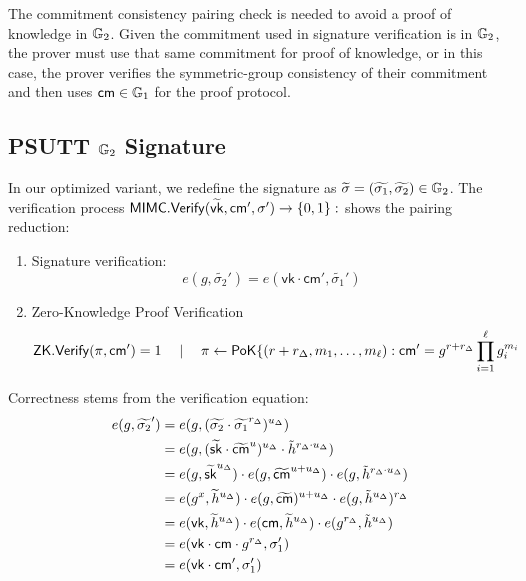 The commitment consistency pairing check is needed to avoid a proof of knowledge in $\mathbb{G}_2$. Given the commitment used in signature verification is in $\mathbb{G}_2$, the prover must use that same commitment for proof of knowledge, or in this case, the prover verifies the symmetric-group consistency of their commitment and then uses $\mathsf{cm} \in \mathbb{G}_1$ for the proof protocol. 

\subsection{PSUTT \cite{tomescu2022utt} $\mathbb{G}_2$ Signature}\label{rerandsig_g2}

In our optimized variant, we redefine the signature as $\widetilde{\sigma} = (\widetilde{\sigma_1}, \widetilde{\sigma_2}) \in \mathbb{G}_2$. The verification process $\mathsf{MIMC.Verify}(\widetilde{\mathsf{vk}}, \mathsf{cm}', {\sigma}') \to \{0,1\}:$ shows the pairing reduction:

\begin{enumerate}
    \item Signature verification:
    \[
    e(g, \widetilde{\sigma_2}') = e(\mathsf{vk} \cdot \mathsf{cm}',\widetilde{\sigma_1}')
    \]
    \item Zero-Knowledge Proof Verification
    \[
    \mathsf{ZK.Verify}(\pi, \mathsf{cm}') = 1 \quad \mid \quad \pi \gets \mathsf{PoK}\{(r + r_\Delta, m_1,\ldots,m_\ell): \mathsf{cm}' = g^{r + r_\Delta} \prod_{i=1}^\ell g_i^{m_i}
    \]
\end{enumerate}

Correctness stems from the verification equation:
    \begin{align*}
        e(g, \widetilde{\sigma_2}') &= e(g, (\widetilde{\sigma_2} \cdot \widetilde{\sigma_1}^{r_\Delta})^{u_\Delta}) \\
        &= e(g, (\widetilde{\mathsf{sk}} \cdot \widetilde{\mathsf{cm}}^{u})^{u_\Delta} \cdot \tilde{h}^{r_{\Delta} \cdot u_\Delta}) \\
        &= e(g, \widetilde{\mathsf{sk}}^{u_\Delta}) \cdot e(g, \widetilde{\mathsf{cm}}^{u + u_\Delta}) \cdot e(g,\tilde{h}^{r_{\Delta} \cdot u_\Delta}) \\
        &= e(g^x, \widetilde{h}^{u_\Delta}) \cdot e(g, \widetilde{\mathsf{cm}})^{u + u_\Delta} \cdot e(g,\tilde{h}^{u_\Delta})^{r_{\Delta}} \\
        &= e(\mathsf{vk}, \widetilde{h}^{u_\Delta}) \cdot e(\mathsf{cm}, \widetilde{h}^{u_\Delta}) \cdot e(g^{r_{\Delta}},\tilde{h}^{u_\Delta}) \\
        &= e(\mathsf{vk} \cdot \mathsf{cm} \cdot g^{r_{\Delta}}, \sigma_1')  \\
        &= e(\mathsf{vk} \cdot \mathsf{cm}', \sigma_1')  \\
    \end{align*}


